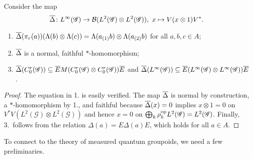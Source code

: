 Consider the map 
\begin{align*}
  \overline{\Delta} \colon L^{\infty}(\mathscr{G}) \to {\cal B}(L^{2}(\mathscr{G}) \otimes L^{2}(\mathscr{G})), \ x
  \mapsto V(x \otimes 1)V^{*}.
\end{align*}
\begin{Lem} \label{lemma:vn-delta}
  \begin{enumerate}
  \item $\overline{\Delta}(\pi_{r}(a)) (\Lambda(b) \otimes \Lambda(c)) =
    \Lambda(a_{(1)}b) \otimes \Lambda(a_{(2)}b)$ for all $a,b,c\in A$;
  \item $\overline{\Delta}$ is a normal, faithful $*$-homomorphism;
  \item  $\overline{\Delta}(C^{r}_{0}(\mathscr{G})) \subseteq \overline{E} M(C^{r}_{0}(\mathscr{G}) \otimes
  C^{r}_{0}(\mathscr{G}))\overline{E}$ and $\overline{\Delta}(L^{\infty}(\mathscr{G})) \subseteq \overline{E}(L^{\infty}(\mathscr{G}) \otimes
  L^{\infty}(\mathscr{G}))\overline{E}$.
  \end{enumerate}
\end{Lem}
\begin{proof}
  The equation in 1.{} is easily verified. The map $\overline{\Delta}$ is
  normal by construction, a $*$-homo\-morphism by 1.{}, and faithful
  because $\overline{\Delta}(x)=0$ implies $x\otimes 1=0$ on
  $V^{*}V(L^{2}(\mathscr{G}) \otimes L^{2}(\mathscr{G}))$ and hence
  $x=0$ on $\bigoplus_{k}
  \rho_{k}^{\operatorname{\mathrm{op}}}L^{2}(\mathscr{G})=L^{2}(\mathscr{G})$. Finally, 3.\
  follows from the relation $\Delta(a)=E\Delta(a)E$, which holds for
  all $a\in A$.
\end{proof}

To connect to the theory of measured quantum groupoids, we need a few
preliminaries.

